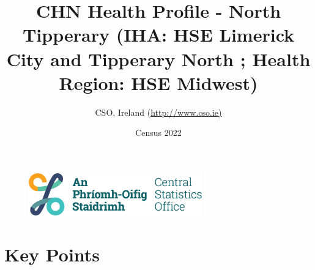 \documentclass{article}
\title{CHN Health Profile - North Tipperary (IHA: HSE Limerick City and Tipperary North ;  Health Region: HSE Midwest) }
\date{Census 2022}
\author{CSO, Ireland  (\url{http://www.cso.ie)}}
\begin{document}


\begin{figure}
	\centering
\includegraphics[width =75mm]{../figures/CSO_Logo.png}
\end{figure}

				 
		   
						  
														  
																																													
												 
			 
\maketitle
					
													   
				 
						 
																																																																											   
				 
				  
  \pagebreak
    	    \tableofcontents

\pagebreak


\section{Key Points}
\end{document}
